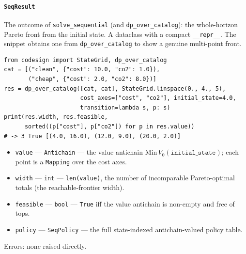\documentclass[11pt,a4paper]{article}
\begin{document}
\paragraph{\texttt{SeqResult}}\label{ref:sequential:seqresult}
The outcome of \texttt{solve\_sequential} (and \texttt{dp\_over\_catalog}):
the whole-horizon Pareto front from the initial state. A dataclass with a
compact \texttt{\_\_repr\_\_}. The snippet obtains one from
\texttt{dp\_over\_catalog} to show a genuine multi-point front.
\begin{lstlisting}
from codesign import StateGrid, dp_over_catalog
cat = [("clean", {"cost": 10.0, "co2": 1.0}),
       ("cheap", {"cost": 2.0, "co2": 8.0})]
res = dp_over_catalog([cat, cat], StateGrid.linspace(0., 4., 5),
                      cost_axes=["cost", "co2"], initial_state=4.0,
                      transition=lambda s, p: s)
print(res.width, res.feasible,
      sorted((p["cost"], p["co2"]) for p in res.value))
# -> 3 True [(4.0, 16.0), (12.0, 9.0), (20.0, 2.0)]
\end{lstlisting}
\begin{itemize}[nosep]
  \item \texttt{value} --- \texttt{Antichain} --- the value antichain
    $\mathrm{Min}\,V_0(\texttt{initial\_state})$; each point is a
    \texttt{Mapping} over the cost axes.
  \item \texttt{width} --- \texttt{int} --- \texttt{len(value)}, the number
    of incomparable Pareto-optimal totals (the reachable-frontier width).
  \item \texttt{feasible} --- \texttt{bool} --- \texttt{True} iff the value
    antichain is non-empty and free of tops.
  \item \texttt{policy} --- \texttt{SeqPolicy} --- the full state-indexed
    antichain-valued policy table.
\end{itemize}
Errors: none raised directly.
\end{document}
